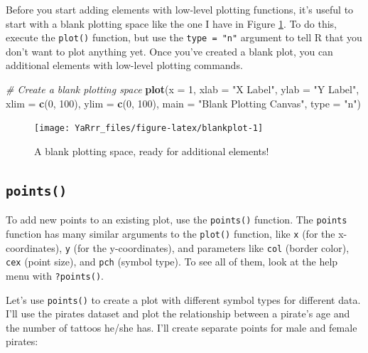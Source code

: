 \documentclass[]{book}
\newenvironment{Shaded}{\begin{snugshade}}{\end{snugshade}}
\newcommand{\KeywordTok}[1]{\textcolor[rgb]{0.13,0.29,0.53}{\textbf{{#1}}}}
\newcommand{\DataTypeTok}[1]{\textcolor[rgb]{0.13,0.29,0.53}{{#1}}}
\newcommand{\DecValTok}[1]{\textcolor[rgb]{0.00,0.00,0.81}{{#1}}}
\newcommand{\StringTok}[1]{\textcolor[rgb]{0.31,0.60,0.02}{{#1}}}
\newcommand{\CommentTok}[1]{\textcolor[rgb]{0.56,0.35,0.01}{\textit{{#1}}}}
\newcommand{\NormalTok}[1]{{#1}}
\theoremstyle{definition}
\theoremstyle{definition}
\theoremstyle{remark}
\begin{document}
Before you start adding elements with low-level plotting functions, it's
useful to start with a blank plotting space like the one I have in
Figure \ref{fig:blankplot}. To do this, execute the \texttt{plot()}
function, but use the \texttt{type\ =\ "n"} argument to tell R that you
don't want to plot anything yet. Once you've created a blank plot, you
can additional elements with low-level plotting commands.

\begin{Shaded}
\begin{Highlighting}[]
\CommentTok{# Create a blank plotting space}
\KeywordTok{plot}\NormalTok{(}\DataTypeTok{x =} \DecValTok{1}\NormalTok{,                 }
     \DataTypeTok{xlab =} \StringTok{"X Label"}\NormalTok{, }
     \DataTypeTok{ylab =} \StringTok{"Y Label"}\NormalTok{,}
     \DataTypeTok{xlim =} \KeywordTok{c}\NormalTok{(}\DecValTok{0}\NormalTok{, }\DecValTok{100}\NormalTok{), }
     \DataTypeTok{ylim =} \KeywordTok{c}\NormalTok{(}\DecValTok{0}\NormalTok{, }\DecValTok{100}\NormalTok{),}
     \DataTypeTok{main =} \StringTok{"Blank Plotting Canvas"}\NormalTok{,}
     \DataTypeTok{type =} \StringTok{"n"}\NormalTok{)}
\end{Highlighting}
\end{Shaded}

\begin{figure}

{\centering \texttt{[image: YaRrr\_files/figure-latex/blankplot-1]} 

}

\caption{A blank plotting space, ready for additional elements!}\label{fig:blankplot}
\end{figure}

\subsection{\texorpdfstring{\texttt{points()}}{points()}}\label{points}

To add new points to an existing plot, use the \texttt{points()}
function. The \texttt{points} function has many similar arguments to the
\texttt{plot()} function, like \texttt{x} (for the x-coordinates),
\texttt{y} (for the y-coordinates), and parameters like \texttt{col}
(border color), \texttt{cex} (point size), and \texttt{pch} (symbol
type). To see all of them, look at the help menu with
\texttt{?points()}.

Let's use \texttt{points()} to create a plot with different symbol types
for different data. I'll use the pirates dataset and plot the
relationship between a pirate's age and the number of tattoos he/she
has. I'll create separate points for male and female pirates:
\end{document}
